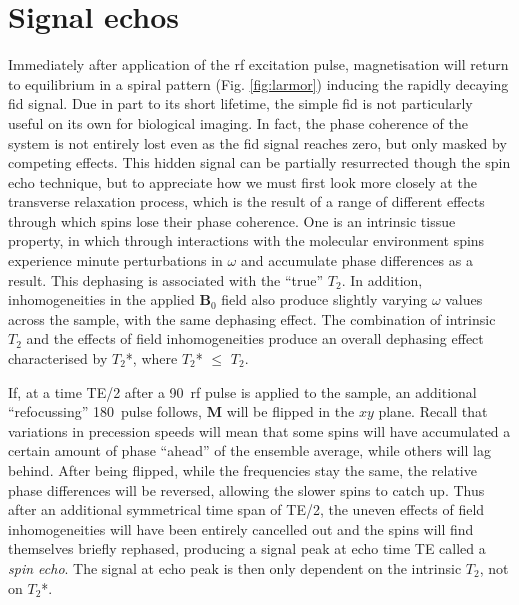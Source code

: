 \section{Signal echos}\label{sec:echos}

Immediately after application of the \gls{rf} excitation pulse, magnetisation will return to equilibrium in a spiral pattern (Fig. \ref{fig:larmor}) inducing the rapidly decaying \gls{fid} signal.
Due in part to its short lifetime, the simple \gls{fid} is not particularly useful on its own for biological imaging.
In fact, the phase coherence of the system is not entirely lost even as the \gls{fid} signal reaches zero, but only masked by competing effects.
This hidden signal can be partially resurrected though the spin echo technique, but to appreciate how we must first look more closely at the transverse relaxation process, which is the result of a range of different effects through which spins lose their phase coherence.
One is an intrinsic tissue property, in which through interactions with the molecular environment spins experience minute perturbations in $\omega$ and accumulate phase differences as a result.
This dephasing is associated with the ``true'' $T_2$.
In addition, inhomogeneities in the applied $\mathbf{B}_0$ field also produce slightly varying $\omega$ values across the sample, with the same dephasing effect.
The combination of intrinsic $T_2$ and the effects of field inhomogeneities produce an overall dephasing effect characterised by $T_2$*, where  $T_2$* $\leqslant$ $T_2$.

If, at a time TE/2 after a 90\textdegree\ \gls{rf} pulse is applied to the sample, an additional ``refocussing'' 180\textdegree\ pulse follows, $\textbf{M}$ will be flipped in the $xy$ plane.
Recall that variations in precession speeds will mean that some spins will have accumulated a certain amount of phase ``ahead'' of the ensemble average, while others will lag behind.
After being flipped, while the frequencies stay the same, the relative phase differences will be reversed, allowing the slower spins to catch up.
Thus after an additional symmetrical time span of TE/2, the uneven effects of field inhomogeneities will have been entirely cancelled out and the spins will find themselves briefly rephased, producing a signal peak at echo time TE called a \textit{spin echo}.
The signal at echo peak is then only dependent on the intrinsic $T_2$, not on $T_2$*.

